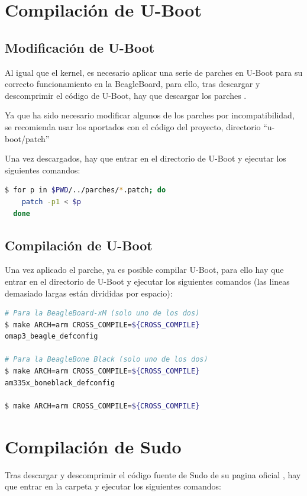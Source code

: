 \documentclass{tfg}
\begin{document}
\section{Compilación de U-Boot}
\subsection{Modificación de U-Boot}
Al igual que el kernel, es necesario aplicar una serie de parches en U-Boot para su correcto funcionamiento en la BeagleBoard, para ello,
tras descargar y descomprimir el código de U-Boot, hay que descargar los parches \cite{ubootpatchomap} \cite{ubootpatchbone}.

Ya que ha sido necesario modificar algunos de los parches por incompatibilidad, se recomienda usar los aportados
con el código del proyecto, directorio ``u-boot/patch''
\\\par
Una vez descargados, hay que entrar en el directorio de U-Boot y ejecutar los siguientes comandos:
\begin{lstlisting}[language=bash,caption=Aplicacion de parches de U-Boot]
$ for p in $PWD/../parches/*.patch; do
    patch -p1 < $p
  done
\end{lstlisting}
%

\subsection{Compilación de U-Boot}
Una vez aplicado el parche, ya es posible compilar U-Boot, para ello hay que entrar en el directorio de U-Boot y ejecutar
los siguientes comandos (las lineas demasiado largas están divididas por espacio):
\begin{lstlisting}[language=bash,caption=Compilacion de U-Boot]
# Para la BeagleBoard-xM (solo uno de los dos)
$ make ARCH=arm CROSS_COMPILE=${CROSS_COMPILE}
omap3_beagle_defconfig

# Para la BeagleBone Black (solo uno de los dos)
$ make ARCH=arm CROSS_COMPILE=${CROSS_COMPILE}
am335x_boneblack_defconfig

$ make ARCH=arm CROSS_COMPILE=${CROSS_COMPILE}
\end{lstlisting}

\section{Compilación de Sudo}
Tras descargar y descomprimir el código fuente de Sudo de su pagina oficial \cite{sudo}, hay que entrar en la carpeta y ejecutar
los siguientes comandos:
\end{document}
